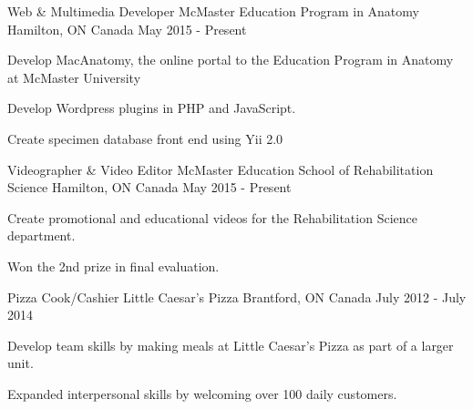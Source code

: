 


\begin{cventries}


\cventry
{Web \& Multimedia Developer} %
{McMaster Education Program in Anatomy} %
{Hamilton, ON Canada} %
{May 2015 - Present} %
{ %
\begin{cvitems}
\item {Develop MacAnatomy, the online portal to the Education Program in 
Anatomy at McMaster University}
\item {Develop Wordpress plugins in PHP and JavaScript.}
\item {Create specimen database front end using Yii 2.0}
\end{cvitems}
}


\cventry
{Videographer \& Video Editor} %
{McMaster Education School of Rehabilitation Science} %
{Hamilton, ON Canada} %
{May 2015 - Present} %
{ %
\begin{cvitems}
\item {Create promotional and educational videos for the Rehabilitation Science 
department.}
\item {Won the 2nd prize in final evaluation.}
\end{cvitems}
}


\cventry
{Pizza Cook/Cashier} %
{Little Caesar's Pizza} %
{Brantford, ON Canada} %
{July 2012 - July 2014} %
{ %
\begin{cvitems}
\item {Develop team skills by making meals at Little Caesar's Pizza as part of 
a larger unit.}
\item {Expanded interpersonal skills by welcoming over 100 daily customers.}
\end{cvitems} 
}


\end{cventries}
